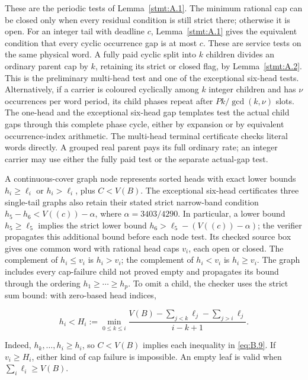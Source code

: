 \documentclass[11pt,a4paper]{article}
\begin{document}
These are the periodic tests of Lemma~\ref{stmt:A.1}. The minimum rational cap can be closed only when every residual condition is still strict there; otherwise it is open. For an integer tail with deadline \(c\), Lemma~\ref{stmt:A.1} gives the equivalent condition that every cyclic occurrence gap is at most \(c\). These are service tests on the same physical word. A fully paid cyclic split into \(k\) children divides an ordinary parent cap by \(k\), retaining its strict or closed flag, by Lemma~\ref{stmt:A.2}. This is the preliminary multi-head test and one of the exceptional six-head tests. Alternatively, if a carrier is coloured cyclically among \(k\) integer children and has \(\nu\) occurrences per word period, its child phases repeat after \(Pk/\gcd(k,\nu)\) slots. The one-head and the exceptional six-head gap templates test the actual child gaps through this complete phase cycle, either by expansion or by equivalent occurrence-index arithmetic. The multi-head terminal certificate checks literal words directly. A grouped real parent pays its full ordinary rate; an integer carrier may use either the fully paid test or the separate actual-gap test.

A continuous-cover graph node represents sorted heads with exact lower bounds \(h_i\ge\ell_i\) or \(h_i>\ell_i\), plus \(C<V(B)\). The exceptional six-head certificate\textquotesingle s three single-tail graphs also retain their stated strict narrow-band condition \(h_5-h_6<V((c))-\alpha\), where \(\alpha=3403/4290\). In particular, a lower bound \(h_5\ge\ell_5\) implies the strict lower bound \(h_6>\ell_5-(V((c))-\alpha)\); the verifier propagates this additional bound before each node test. Its checked source box gives one common word with rational head caps \(v_i\), each open or closed. The complement of \(h_i\le v_i\) is \(h_i>v_i\); the complement of \(h_i<v_i\) is \(h_i\ge v_i\). The graph includes every cap-failure child not proved empty and propagates its bound through the ordering \(h_1\ge\cdots\ge h_p\). To omit a child, the checker uses the strict sum bound: with zero-based head indices,

\begin{equation}
h_i<H_i:=
 \min_{0\le k\le i}
 \frac{V(B)-\sum_{j<k}\ell_j-\sum_{j>i}\ell_j}{i-k+1}.
\tag{B.9}\label{eq:B.9}
\end{equation}

Indeed, \(h_k,\ldots,h_i\ge h_i\), so \(C<V(B)\) implies each inequality in \eqref{eq:B.9}. If \(v_i\ge H_i\), either kind of cap failure is impossible. An empty leaf is valid when \(\sum_i\ell_i\ge V(B)\).
\end{document}
